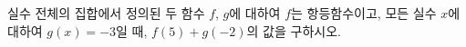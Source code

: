 실수 전체의 집합에서 정의된 두 함수 $f$, $g$에 대하여 $f$는 항등함수이고, 모든 실수 $x$에 대하여 $g(x)=-3$일 때, $f(5)+g(-2)$의 값을 구하시오.
